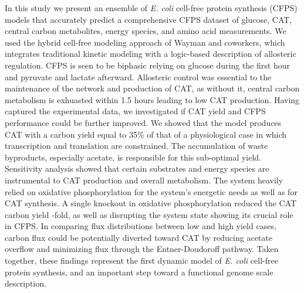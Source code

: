 \documentclass[12pt]{article}
\begin{document}
In this study we present an ensemble of \textit{E. coli} cell-free protein synthesis (CFPS) models that accurately predict a comprehensive CFPS dataset of glucose, CAT, central carbon metabolites, energy species, and amino acid measurements.
We used the hybrid cell-free modeling approach of Wayman and coworkers, which integrates traditional kinetic modeling with a logic-based description of allosteric regulation.
CFPS is seen to be biphasic relying on glucose during the first hour and pyruvate and lactate afterward.
Allosteric control was essential to the maintenance of the network and production of CAT, as without it, central carbon metabolism is exhuasted within 1.5 hours leading to low CAT production.
Having captured the experimental data, we investigated if CAT yield and CFPS performance could be further improved.
We showed that the model produces CAT with a carbon yield equal to 35\% of that of a physiological case in which transcription and translation are constrained.
The accumulation of waste byproducts, especially acetate, is responsible for this sub-optimal yield.
Sensitivity analysis showed that certain substrates and energy species are instrumental to CAT production and overall metabolism.
The system heavily relied on oxidative phosphorylation for the system's energetic needs as well as for CAT synthesis.
A single knockout in oxidative phosphorylation reduced the CAT carbon yield -fold, as well as disrupting the system state showing its crucial role in CFPS.
In comparing flux distributions between low and high yield cases, carbon flux could be potentially diverted toward CAT by reducing acetate overflow and minimizing flux through the Entner-Doudoroff pathway.
Taken together, these findings represent the first dynamic model of \textit{E. coli} cell-free protein synthesis, and an important step toward a functional genome scale description.
\end{document}
